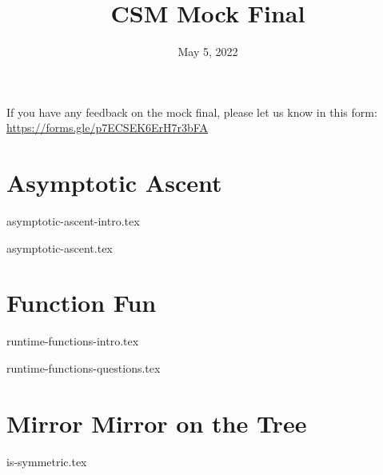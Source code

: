 \documentclass[11pt]{exam}
\title{CSM Mock Final}
\date{May 5, 2022}
\begin{document}
\maketitle
If you have any feedback on the mock final, please let us know in this form: \href{https://forms.gle/p7ECSEK6ErH7r3bFA}{https://forms.gle/p7ECSEK6ErH7r3bFA}


\section{Asymptotic Ascent}
{asymptotic-ascent-intro.tex}
\begin{questions}
{asymptotic-ascent.tex}

\end{questions}

\newpage
\section{Function Fun}
{runtime-functions-intro.tex}
\begin{questions}
{runtime-functions-questions.tex}
\end{questions}

\newpage
\section{Mirror Mirror on the Tree}
\begin{questions}
{is-symmetric.tex}
\end{questions}
\end{document}
